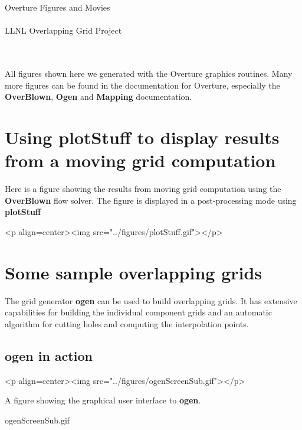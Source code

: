 \documentclass{article}
\begin{document}
\begin{center}
{\Large Overture Figures and Movies} \\
~~ \\
LLNL Overlapping Grid Project \\
 \\
  \\
\end{center}


All figures shown here we generated with the Overture graphics routines.
Many more figures can be found in the documentation for Overture, especially
the {\bf OverBlown}, {\bf Ogen} and {\bf Mapping} documentation.

\section{Using plotStuff to display results from a moving grid computation}

Here is a figure showing the results from moving grid computation using the {\bf OverBlown} flow solver. 
The figure is displayed in a post-processing
mode using {\bf plotStuff}
\begin{rawhtml}
<p align=center><img src="../figures/plotStuff.gif"></p>
\end{rawhtml}

\section{Some sample overlapping grids}

The  grid generator {\bf ogen} can be used to
build overlapping grids. It has extensive capabilities
for building the individual component grids and an automatic
algorithm for cutting holes and computing the interpolation 
points.

\subsection{{\bf ogen} in action}

\begin{rawhtml}
<p align=center><img  src="../figures/ogenScreenSub.gif"></p>
\end{rawhtml}
\begin{flushleft}
{\LARGE A figure showing the graphical user interface to {\bf ogen}.}
\end{flushleft}
ogenScreenSub.gif
\end{document}
